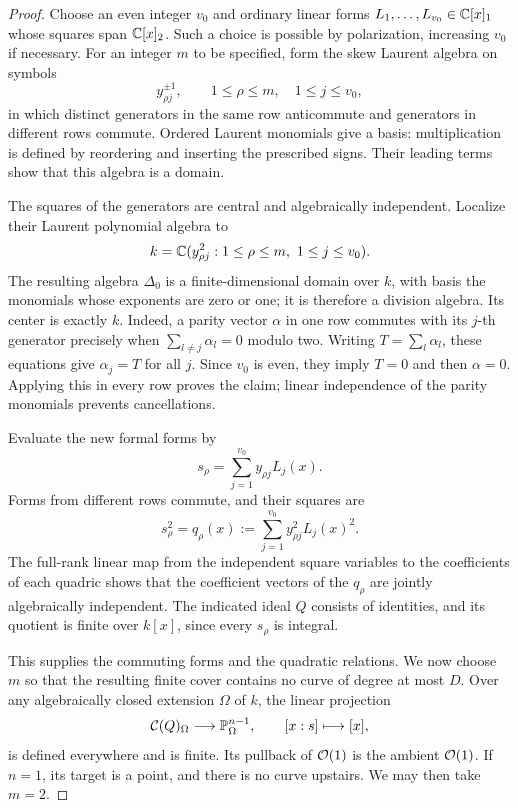 \begin{proof}
Choose an even integer \(v_0\) and ordinary linear forms
\(L_1,\ldots,L_{v_0}\in\mathbb C[x]_1\) whose squares span \(\mathbb C[x]_2\).
Such a choice is possible by polarization, increasing \(v_0\) if
necessary. For an integer \(m\) to be specified, form the skew Laurent
algebra on symbols
\[
 y_{\rho j}^{\pm1},
 \qquad 1\le\rho\le m,\quad 1\le j\le v_0,
\]
in which distinct generators in the same row anticommute and
generators in different rows commute. Ordered Laurent monomials
give a basis: multiplication is defined by reordering and inserting
the prescribed signs. Their leading terms show that this algebra
is a domain.

The squares of the generators are central and algebraically
independent. Localize their Laurent polynomial algebra to
\[
 k=\mathbb C(y_{\rho j}^2:1\le\rho\le m,\ 1\le j\le v_0).
\]
The resulting algebra \(\Delta_0\) is a finite-dimensional domain
over \(k\), with basis the monomials whose exponents are zero or one;
it is therefore a division algebra. Its center is exactly \(k\).
Indeed, a parity vector \(\alpha\) in one row commutes with its
\(j\)-th generator precisely when
\(\sum_{l\ne j}\alpha_l=0\) modulo two. Writing
\(T=\sum_l\alpha_l\), these equations give \(\alpha_j=T\) for all
\(j\). Since \(v_0\) is even, they imply \(T=0\) and then
\(\alpha=0\). Applying this in every row proves the claim; linear
independence of the parity monomials prevents cancellations.

Evaluate the new formal forms by
\[
 s_\rho=\sum_{j=1}^{v_0}y_{\rho j}L_j(x).
\]
Forms from different rows commute, and their squares are
\[
 s_\rho^2=q_\rho(x)
 :=\sum_{j=1}^{v_0}y_{\rho j}^2L_j(x)^2.
\]
The full-rank linear map from the independent square variables
to the coefficients of each quadric shows that the coefficient
vectors of the \(q_\rho\) are jointly algebraically independent.
The indicated ideal \(Q\) consists of identities, and its quotient
is finite over \(k[x]\), since every \(s_\rho\) is integral.

This supplies the commuting forms and the quadratic relations.
We now choose \(m\) so that the resulting finite cover contains no
curve of degree at most \(D\).
Over any algebraically closed extension \(\Omega\) of \(k\), the
linear projection
\[
 \mathcal C(Q)_\Omega\longrightarrow\mathbb P^{n-1}_\Omega,
 \qquad [x:s]\longmapsto[x],
\]
is defined everywhere and is finite. Its pullback of \(\mathcal O(1)\)
is the ambient \(\mathcal O(1)\). If \(n=1\), its target is a point,
and there is no curve upstairs. We may then take \(m=2\).


\end{proof}
